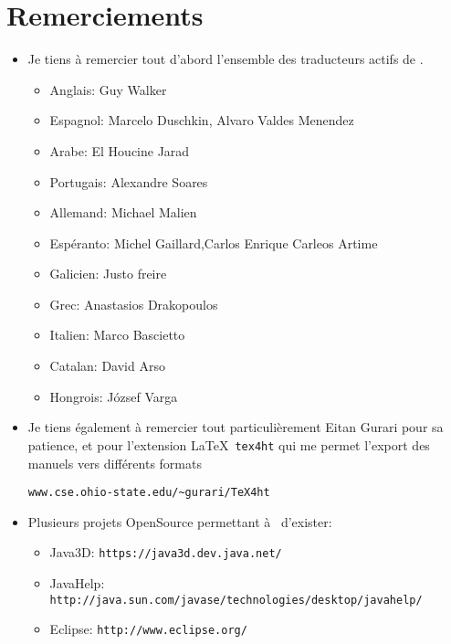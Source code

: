 \chapter*{Remerciements}
\begin{itemize}
 \item Je tiens à remercier tout d'abord l'ensemble des traducteurs actifs de \xlogo.\\
\vspace{0.2cm}
\begin{itemize}
\item Anglais: Guy Walker
\item Espagnol: Marcelo Duschkin, Alvaro Valdes Menendez
\item Arabe: El Houcine Jarad
\item Portugais: Alexandre Soares
\item Allemand: Michael Malien
\item Espéranto: Michel Gaillard,Carlos Enrique Carleos Artime
\item Galicien: Justo freire
\item Grec: Anastasios Drakopoulos
\item Italien: Marco Bascietto
\item Catalan: David Arso
\item Hongrois: József Varga
\end{itemize}
\vspace{0.5cm}
\item Je tiens également à remercier tout particulièrement Eitan Gurari pour sa patience, et pour l'extension \LaTeX\ \texttt{tex4ht} qui me permet l'export des manuels vers différents formats  
\begin{center}
\texttt{www.cse.ohio-state.edu/\textasciitilde gurari/TeX4ht} 
\end{center}
\vspace{0.5cm}
\item Plusieurs projets OpenSource permettant à \xlogo\ d'exister: \\
\vspace{0.2cm}
\begin{itemize}
 \item Java3D: \texttt{https://java3d.dev.java.net/} \\
\vspace{0.2cm}
 \item JavaHelp: \texttt{http://java.sun.com/javase/technologies/desktop/javahelp/} \\
\vspace{0.2cm}
 \item Eclipse: \texttt{http://www.eclipse.org/} \\

\end{itemize}
\end{itemize}
